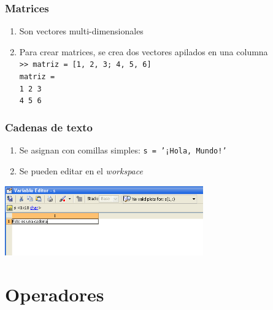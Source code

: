 \begin{frame}[label=matrices]
 \frametitle{Matrices}
 \begin{enumerate}
  \item Son vectores multi-dimensionales
  \item Para crear matrices, se crea dos vectores apilados en una columna
    \\\texttt{>> matriz = [1, 2, 3; 4, 5, 6] \\matriz = \\ \hspace*{0.5cm} 1
    \hspace*{0.25cm} 2 \hspace*{0.25cm} 3 \\ \hspace*{0.5cm} 4 \hspace*{0.25cm}
    5 \hspace*{0.25cm} 6}
 \end{enumerate}
\end{frame}
\begin{frame}[label=cadenas]
 \frametitle{Cadenas de texto}
   \begin{enumerate}
    \item Se asignan con comillas simples: \texttt{s = '¡Hola, Mundo!'}
    \item Se pueden editar en el \emph{workspace}
   \end{enumerate}
  \begin{center}
   \includegraphics[height=3cm]{images/cadena_workspace}
  \end{center}
\end{frame}
\section{Operadores}
